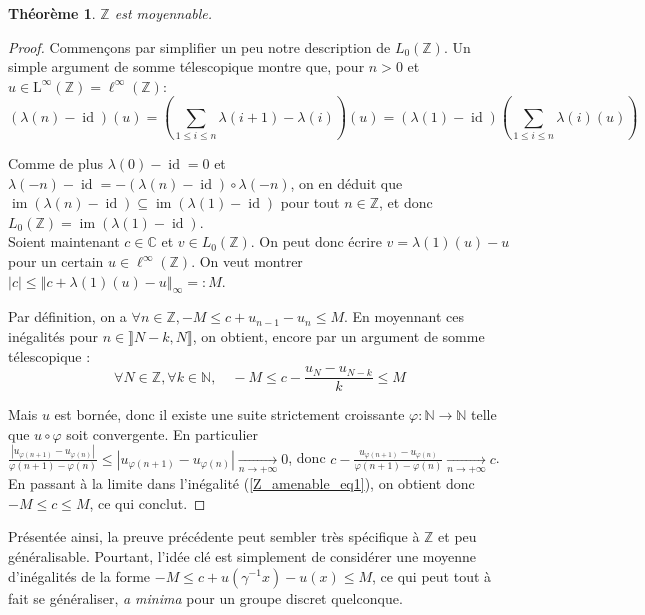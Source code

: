 \documentclass[a4paper,12pt]{article}
\newtheorem{theorem}{Théorème}[section]
\newcommand{\N}{\mathbb{N}}
\newcommand{\Z}{\mathbb{Z}}
\newcommand{\C}{\mathbb{C}}
\newcommand{\norm}[1]{\left\Vert #1\right\Vert}
\newcommand{\abs}[1]{\left\vert#1\right\vert}
\newcommand{\inv}{^{-1}}
\newcommand{\comp}{\circ}
\DeclareMathOperator{\id}{id}
\DeclareMathOperator{\Ima}{im}
\begin{document}
\begin{theorem}\label{Z_amenable}
    $\Z$ est moyennable.
\end{theorem}

\begin{proof}
    Commençons par simplifier un peu notre description de $L_0(\Z)$. Un simple argument de somme
    télescopique montre que, pour $n>0$ et $u\in \mathrm{L}^\infty(\Z)=\ell^\infty(\Z)$:
    \begin{equation*}
        (\lambda(n)-\id)(u) = \left(\sum_{1\le i\le n} \lambda(i+1) - \lambda(i)\right)(u) = (\lambda(1)-\id)\left(\sum_{1\le i\le n} \lambda(i)(u)\right)
    \end{equation*}

    Comme de plus $\lambda(0)-\id = 0$ et $\lambda(-n)-\id = -(\lambda(n)-\id)\comp\lambda(-n)$,
    on en déduit que $\Ima(\lambda(n)-\id)\subseteq\Ima(\lambda(1)-\id)$ pour tout $n\in\Z$, et donc $L_0(\Z) = \Ima(\lambda(1)-\id)$. \\

    Soient maintenant $c\in\C$ et $v\in L_0(\Z)$. On peut donc écrire $v = \lambda(1)(u)-u$ pour un certain $u\in\ell^\infty(\Z)$. 
    On veut montrer $\abs{c}\le\norm{c + \lambda(1)(u) - u}_\infty =: M$. 

    Par définition, on a $\forall n\in\Z, -M\le c+u_{n-1}-u_n\le M$. En moyennant ces inégalités pour 
    $n\in\rrbracket N-k, N\rrbracket$, on obtient, encore par un argument de somme télescopique :
    \begin{equation}\label{Z_amenable_eq1}
        \forall N\in\Z, \forall k\in\N,\quad -M\le c-\frac{u_N - u_{N-k}}{k} \le M
    \end{equation}

    Mais $u$ est bornée, donc il existe une suite strictement croissante $\varphi:\N\to\N$ telle que $u\comp\varphi$
    soit convergente. En particulier $\frac{\abs{u_{\varphi(n+1)}-u_{\varphi(n)}}}{\varphi(n+1)-\varphi(n)}\le\abs{u_{\varphi(n+1)}-u_{\varphi(n)}}\xrightarrow[n\to+\infty]{}0$, 
    donc $c-\frac{u_{\varphi(n+1)}-u_{\varphi(n)}}{\varphi(n+1)-\varphi(n)}\xrightarrow[n\to+\infty]{}c$. En passant à la limite dans l'inégalité (\ref{Z_amenable_eq1}),
    on obtient donc $-M\le c\le M$, ce qui conclut.
\end{proof}

Présentée ainsi, la preuve précédente peut sembler très spécifique à $\Z$ et peu généralisable. Pourtant, l'idée clé 
est simplement de considérer une \og{}moyenne\fg{} d'inégalités de la forme $-M\le c + u(\gamma\inv x) - u(x)\le M$, 
ce qui peut tout à fait se généraliser, \emph{a minima} pour un groupe discret quelconque. 
\end{document}
